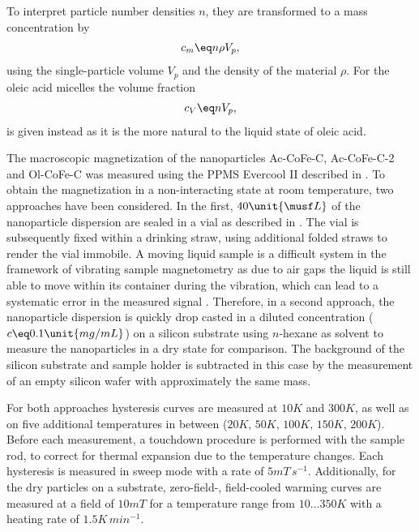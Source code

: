 \documentclass[\main/dresen_thesis.tex]{subfiles}
\begin{document}
    To interpret particle number densities $n$, they are transformed to a mass concentration by
    \begin{align}
      c_m \eq n \rho V_p,
    \end{align}
    using the single-particle volume $V_p$ and the density of the material $\rho$.
    For the oleic acid micelles the volume fraction
    \begin{align}
      c_V \eq n V_p,
    \end{align}
    is given instead as it is the more natural to the liquid state of oleic acid.

    The macroscopic magnetization of the nanoparticles Ac-CoFe-C, Ac-CoFe-C-2 and Ol-CoFe-C was measured using the PPMS Evercool II described in .
    To obtain the magnetization in a non-interacting state at room temperature, two approaches have been considered.
    In the first, $40 \unit{\musf L}$ of the nanoparticle dispersion are sealed in a vial as described in .
    The vial is subsequently fixed within a drinking straw, using additional folded straws to render the vial immobile.
    A moving liquid sample is a difficult system in the framework of vibrating sample magnetometry as due to air gaps the liquid is still able to move within its container during the vibration, which can lead to a systematic error in the measured signal \cite{Boekelheide_2016_Artif}.
    Therefore, in a second approach, the nanoparticle dispersion is quickly drop casted in a diluted concentration ($c \eq 0.1 \unit{mg/mL}$) on a silicon substrate using $\textit{n}$-hexane as solvent to measure the nanoparticles in a dry state for comparison.
    The background of the silicon substrate and sample holder is subtracted in this case by the measurement of an empty silicon wafer with approximately the same mass.

    For both approaches hysteresis curves are measured at $10 \unit{K}$ and $300 \unit{K}$, as well as on five additional temperatures in between ($20\unit{K},\,50\unit{K},\,100\unit{K},\,150\unit{K},\,200\unit{K}$).
    Before each measurement, a touchdown procedure is performed with the sample rod, to correct for thermal expansion due to the temperature changes.
    Each hysteresis is measured in sweep mode with a rate of $5 \unit{mT \, s^{-1}}$.
    Additionally, for the dry particles on a substrate, zero-field-, field-cooled warming curves are measured at a field of $10 \unit{mT}$ for a temperature range from $10 \ldots 350 \unit{K}$ with a heating rate of $1.5 \unit{K \, min^{-1}}$.
\end{document}
